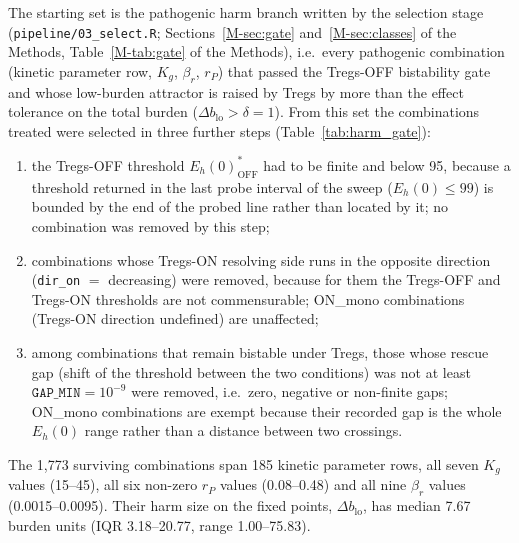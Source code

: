 \documentclass[11pt]{article}
\begin{document}
The starting set is the pathogenic harm branch written by the
selection stage (\texttt{pipeline/03\_select.R}; Sections~\ref{M-sec:gate} and~\ref{M-sec:classes} of the Methods,
Table~\ref{M-tab:gate} of the Methods), i.e.\ every pathogenic combination (kinetic parameter row,
$K_g$, $\beta_r$, $r_P$) that passed the Tregs-OFF bistability
gate and whose low-burden attractor is raised by Tregs by more than the effect
tolerance on the total burden ($\Delta b_{\mathrm{lo}} > \delta = 1$). From this set the
combinations treated were selected in three further steps
(Table~\ref{tab:harm_gate}):
\begin{enumerate}
\item the Tregs-OFF threshold $E_h(0)^*_{\mathrm{OFF}}$ had to be finite and
  below 95, because a threshold returned in the last probe interval of the sweep
  ($E_h(0)\le 99$) is bounded by the end of the probed line rather than located
  by it; no combination was removed by this step;
\item combinations whose Tregs-ON resolving side runs in the opposite direction
  (\texttt{dir\_on} $=$ decreasing) were removed, because for them the Tregs-OFF
  and Tregs-ON thresholds are not commensurable; ON\_mono
  combinations (Tregs-ON direction undefined) are unaffected;
\item among combinations that remain bistable under Tregs, those whose rescue
  gap (shift of the threshold between the two conditions) was not at least
  $\texttt{GAP\_MIN}=10^{-9}$ were removed, i.e.\ zero, negative or non-finite
  gaps; ON\_mono combinations are exempt because their recorded gap is
  the whole $E_h(0)$ range rather than a distance between two crossings.
\end{enumerate}
The 1,773 surviving combinations span 185 kinetic parameter rows, all seven
$K_g$ values (15--45), all six non-zero $r_P$ values (0.08--0.48) and all
nine $\beta_r$ values (0.0015--0.0095). Their harm size on the
fixed points, $\Delta b_{\mathrm{lo}}$, has median 7.67 burden units (IQR
3.18--20.77, range 1.00--75.83).
\end{document}

